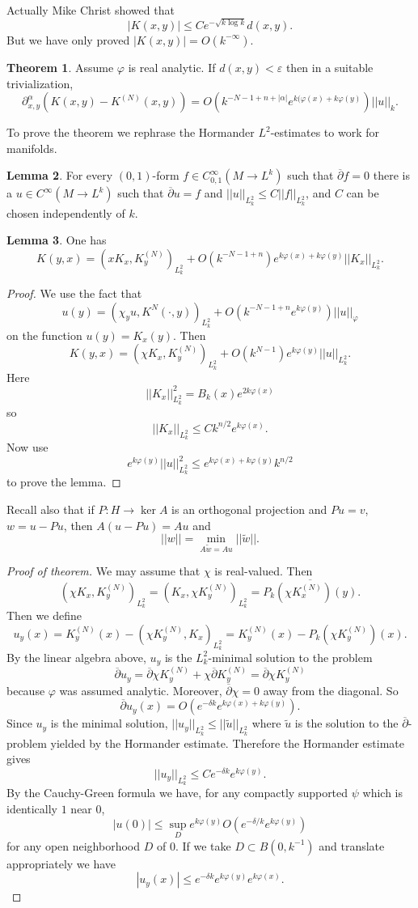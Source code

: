 \documentclass[12pt]{report}
\newcommand{\dbar}{\overline \partial}
\theoremstyle{definition}
\newtheorem{theorem}{Theorem}[chapter]
\newtheorem{lemma}[theorem]{Lemma}
\begin{document}
    Actually Mike Christ showed that
    $$|K(x, y)| \leq Ce^{-\sqrt{k \log k}}d(x, y).$$
    But we have only proved $|K(x, y)| = O(k^{-\infty})$.
\begin{theorem}
    Assume $\varphi$ is real analytic. If $d(x, y) < \varepsilon$ then in a suitable trivialization,
    $$\partial^\alpha_{x,y}(K(x, y) - K^{(N)}(x, y)) = O(k^{-N-1+n+|\alpha|}e^{k(\varphi(x)+k\varphi(y)})||u||_k.$$
\end{theorem}
    To prove the theorem we rephrase the Hormander $L^2$-estimates to work for manifolds.
\begin{lemma}
    For every $(0, 1)$-form $f \in C^\infty_{0,1}(M \to L^k)$ such that $\dbar f = 0$ there is a $u \in C^\infty(M \to L^k)$ such that $\dbar u = f$ and $||u||_{L^2_k} \leq C||f||_{L^2_k}$, and $C$ can be chosen independently of $k$.
\end{lemma}
\begin{lemma}
    One has
    $$K(y, x) = (xK_x, K_y^{(N)})_{L^2_k} + O(k^{-N-1+n})e^{k\varphi(x) + k\varphi(y)}||K_x||_{L^2_k}.$$
\end{lemma}
\begin{proof}
    We use the fact that
    $$u(y) = (\chi_yu, K^N(\cdot, y))_{L^2_k} + O(k^{-N-1+n}e^{k\varphi(y)})||u||_\varphi$$
    on the function $u(y) = K_x(y)$. Then
    $$K(y, x) = (\chi K_x, K_y^{(N)})_{L^2_k} + O(k^{N-1})e^{k\varphi(y)}||u||_{L^2_k}.$$
    Here
    $$||K_x||_{L^2_k}^2 = B_k(x)e^{2k\varphi(x)}$$
    so
    $$||K_x||_{L^2_k} \leq Ck^{n/2}e^{k\varphi(x)}.$$
    Now use
    $$e^{k\varphi(y)}||u||_{L^2_k}^2 \leq e^{k\varphi(x) + k\varphi(y)} k^{n/2}$$
    to prove the lemma. 
\end{proof}
    Recall also that if $P: H \to \ker A$ is an orthogonal projection and $Pu = v$, $w = u - Pu$, then $A(u - Pu) = Au$ and
    $$||w|| = \min_{A\tilde w = Au} ||\tilde w||.$$
\begin{proof}[Proof of theorem]
    We may assume that $\chi$ is real-valued. Then
    $$(\chi K_x, K_y^{(N)})_{L^2_k} = (K_x, \chi K_y^{(N)})_{L^2_k} = \overline{P_k(\chi K_x^{(N)})(y)}.$$
    Then we define
    $$u_y(x) = K_y^{(N)}(x) - (\chi K_y^{(N)}, K_x)_{L^2_k} = K_y^{(N)}(x) - P_k(\chi K_y^{(N)})(x).$$
    By the linear algebra above, $u_y$ is the $L^2_k$-minimal solution to the problem
    $$\dbar u_y = \dbar \chi K_y^{(N)} + \chi \dbar K_y^{(N)} = \dbar \chi K_y^{(N)}$$
    because $\varphi$ was assumed analytic. Moreover, $\dbar \chi = 0$ away from the diagonal. So
    $$\dbar u_y(x) = O(e^{-\delta k}e^{k\varphi(x) + k\varphi(y)}).$$
    Since $u_y$ is the minimal solution, $||u_y||_{L^2_k} \leq ||\tilde u||_{L^2_k}$ where $\tilde u$ is the solution to the $\dbar$-problem yielded by the Hormander estimate. Therefore the Hormander estimate gives
    $$||u_y||_{L^2_k} \leq Ce^{-\delta k}e^{k\varphi(y)}.$$
    By the Cauchy-Green formula we have, for any compactly supported $\psi$ which is identically $1$ near $0$,
    $$|u(0)| \leq \sup_D e^{k\varphi(y)} O(e^{-\delta/k} e^{k\varphi(y)})$$
    for any open neighborhood $D$ of $0$. If we take $D \subset B(0, k^{-1})$ and translate appropriately we have
    $$|u_y(x)| \leq e^{-\delta k}e^{k\varphi(y)} e^{k\varphi(x)}.$$
\end{proof}
\end{document}
